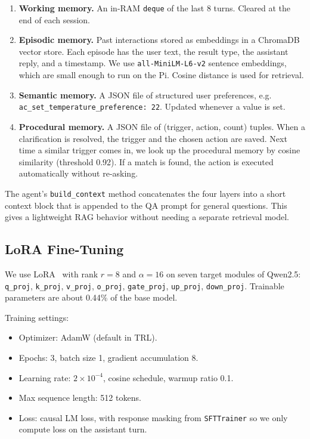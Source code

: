 \documentclass[conference]{IEEEtran}
\begin{document}
\begin{enumerate}
    \item \textbf{Working memory.} An in-RAM \texttt{deque} of the last 8 turns. Cleared at the end of each session.
    \item \textbf{Episodic memory.} Past interactions stored as embeddings in a ChromaDB vector store. Each episode has the user text, the result type, the assistant reply, and a timestamp. We use \texttt{all-MiniLM-L6-v2} sentence embeddings, which are small enough to run on the Pi. Cosine distance is used for retrieval.
    \item \textbf{Semantic memory.} A JSON file of structured user preferences, e.g. \texttt{ac\_set\_temperature\_preference: 22}. Updated whenever a value is set.
    \item \textbf{Procedural memory.} A JSON file of (trigger, action, count) tuples. When a clarification is resolved, the trigger and the chosen action are saved. Next time a similar trigger comes in, we look up the procedural memory by cosine similarity (threshold 0.92). If a match is found, the action is executed automatically without re-asking.
\end{enumerate}

The agent's \texttt{build\_context} method concatenates the four layers into a short context block that is appended to the QA prompt for general questions. This gives a lightweight RAG behavior without needing a separate retrieval model.

\subsection{LoRA Fine-Tuning}

We use LoRA~\cite{hu2022lora} with rank $r=8$ and $\alpha=16$ on seven target modules of Qwen2.5: \texttt{q\_proj}, \texttt{k\_proj}, \texttt{v\_proj}, \texttt{o\_proj}, \texttt{gate\_proj}, \texttt{up\_proj}, \texttt{down\_proj}. Trainable parameters are about 0.44\% of the base model.

Training settings:
\begin{itemize}
    \item Optimizer: AdamW (default in TRL).
    \item Epochs: 3, batch size 1, gradient accumulation 8.
    \item Learning rate: $2 \times 10^{-4}$, cosine schedule, warmup ratio 0.1.
    \item Max sequence length: 512 tokens.
    \item Loss: causal LM loss, with response masking from \texttt{SFTTrainer} so we only compute loss on the assistant turn.
\end{itemize}
\end{document}
